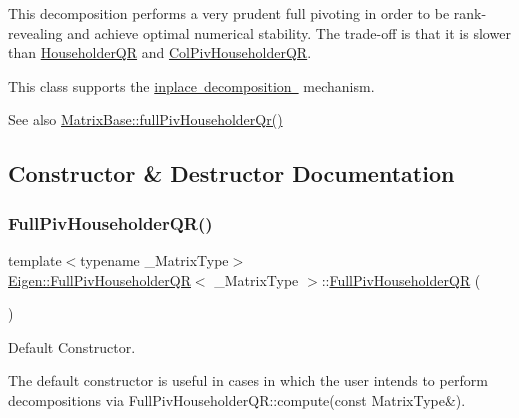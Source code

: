 This decomposition performs a very prudent full pivoting in order to be rank-\/revealing and achieve optimal numerical stability. The trade-\/off is that it is slower than \mbox{\hyperlink{class_eigen_1_1_householder_q_r}{Householder\+QR}} and \mbox{\hyperlink{class_eigen_1_1_col_piv_householder_q_r}{Col\+Piv\+Householder\+QR}}.

This class supports the \mbox{\hyperlink{}{inplace decomposition }} mechanism.

\begin{DoxySeeAlso}{See also}
\mbox{\hyperlink{class_eigen_1_1_matrix_base_a863bc0e06b641a089508eabec6835ab2}{Matrix\+Base\+::full\+Piv\+Householder\+Qr()}} 
\end{DoxySeeAlso}


\subsection{Constructor \& Destructor Documentation}
\mbox{\label{class_eigen_1_1_full_piv_householder_q_r_aeb14b4c1eef33128207b40a00bd0bd08}} 
\subsubsection{\texorpdfstring{FullPivHouseholderQR()}{FullPivHouseholderQR()}\hspace{0.1cm}{\footnotesize\ttfamily [1/4]}}
{\footnotesize\ttfamily template$<$typename \+\_\+\+Matrix\+Type$>$ \\
\mbox{\hyperlink{class_eigen_1_1_full_piv_householder_q_r}{Eigen\+::\+Full\+Piv\+Householder\+QR}}$<$ \+\_\+\+Matrix\+Type $>$\+::\mbox{\hyperlink{class_eigen_1_1_full_piv_householder_q_r}{Full\+Piv\+Householder\+QR}} (\begin{DoxyParamCaption}{ }\end{DoxyParamCaption})\hspace{0.3cm}{\ttfamily [inline]}}



Default Constructor. 

The default constructor is useful in cases in which the user intends to perform decompositions via Full\+Piv\+Householder\+Q\+R\+::compute(const Matrix\+Type\&). \mbox{\label{class_eigen_1_1_full_piv_householder_q_r_abf722e1dc7241a5d6f76460ef0c87821}} 
